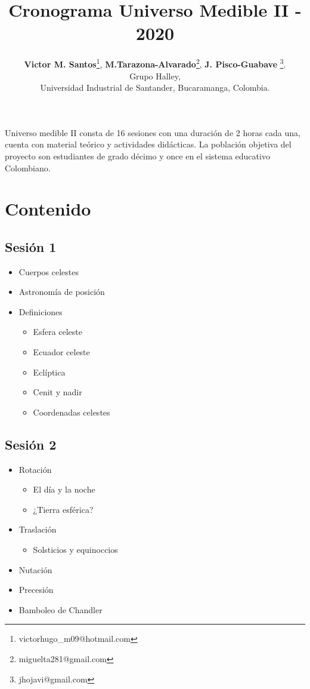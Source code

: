 \documentclass[10pt,a4paper]{article}
\title{Cronograma Universo Medible II - 2020}
\author{\textbf{Victor M. Santos}\thanks{victorhugo\_m09@hotmail.com}, \textbf{M.Tarazona-Alvarado}\thanks{miguelta281@gmail.com}, \textbf{J. Pisco-Guabave} \thanks{jhojavi@gmail.com}. \\ Grupo Halley, \\ Universidad Industrial de Santander, Bucaramanga, Colombia.}
\date{ }
\begin{document}
\maketitle

Universo medible II consta de 16 sesiones con una duración de 2 horas cada una, cuenta con material teórico y actividades didácticas. La población objetiva del proyecto son estudiantes de grado décimo y once en el sistema educativo Colombiano. 

\tableofcontents

\section{Contenido}
\subsection{Sesión 1}
\begin{itemize}
 \item Cuerpos celestes
 \item Astronomía de posición
 \item Definiciones
 \begin{itemize}
  \item Esfera celeste
  \item Ecuador celeste
  \item Eclíptica
  \item Cenit y nadir
  \item Coordenadas celestes
 \end{itemize}
\end{itemize}

\subsection{Sesión 2}
\begin{itemize}
 \item Rotación
 \begin{itemize}
  \item El día y la noche
  \item ¿Tierra esférica?
 \end{itemize}
 \item Traslación
 \begin{itemize}
  \item Solsticios y equinoccios
 \end{itemize}
 \item Nutación
 \item Precesión
 \item Bamboleo de Chandler
\end{itemize}
\end{document}

